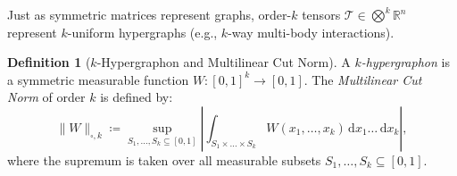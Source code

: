 \documentclass[11pt,a4paper,reqno]{amsart}
\theoremstyle{definition}
\newtheorem{definition}[theorem]{Definition}
\numberwithin{equation}{section}
\providecommand{\R}{\mathbb{R}}
\newcommand{\dif}{\,\mathrm{d}}
\begin{document}
Just as symmetric matrices represent graphs, order-$k$ tensors $\mathcal{T} \in \bigotimes^k \R^n$ represent $k$-uniform hypergraphs (e.g., $k$-way multi-body interactions).

\begin{definition}[$k$-Hypergraphon and Multilinear Cut Norm]
A \emph{$k$-hypergraphon} is a symmetric measurable function $W \colon [0, 1]^k \to [0, 1]$. The \emph{Multilinear Cut Norm} of order $k$ is defined by:
\begin{equation}
    \label{eq:hypergraphon_cutnorm}
    \|W\|_{\square, k} \coloneqq \sup_{S_1, \dots, S_k \subseteq [0, 1]} \left| \int_{S_1 \times \dots \times S_k} W(x_1, \dots, x_k) \dif x_1 \dots \dif x_k \right|,
\end{equation}
where the supremum is taken over all measurable subsets $S_1, \dots, S_k \subseteq [0, 1]$.
\end{definition}
\end{document}
